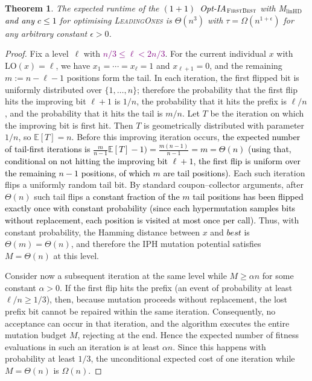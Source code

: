 \documentclass[lettersize,journal]{IEEEtran}
\newcommand{\new}[1]{\textcolor{black}{#1}}
\newcommand{\rerev}[1]{\textcolor{purple}{#1}}
\newcommand{\EE}{\mathbb{E}}
\newcommand{\linHD}{M$_{\text{linHD}}$}
\newtheorem{theorem}{Theorem}
\begin{document}
\begin{theorem}\label{thm:FBleadingones}
The expected runtime of the \new{$(1+1)$~Opt-IA$_{\textsc{FirstBest}}$}  with {\linHD } \new{and any $c\leq 1$} for optimising
\textsc{LeadingOnes} is $\Theta(n^3)$ with $\tau=\Omega(n^{1+\epsilon})$ for any arbitrary
constant $\epsilon>0$.
\end{theorem}
\begin{proof}

Fix a level~$\ell$ with \rerev{$n/3 \le \ell < 2n/3$}. For the current individual $x$ with $\mathrm{LO}(x)=\ell$, we have $x_1=\cdots=x_{\ell}=1$ and $x_{\ell+1}=0$, and the remaining $m:=n-\ell-1$ positions form the tail. In each iteration, the first flipped bit is uniformly distributed over $\{1,\dots,n\}$; therefore the probability that the first flip hits the improving bit $\ell+1$ is $1/n$, the probability that it hits the prefix is $\ell/n$, and the probability that it hits the tail is $m/n$. Let $T$ be the iteration on which the improving bit is first hit. Then $T$ is geometrically distributed with parameter~$1/n$, so $\EE[T]=n$. Before this improving iteration occurs, \textcolor{black}{the expected number of tail-first iterations is
$\frac{m}{n-1}\EE[T]-1) = \frac{m(n-1)}{n-1} = m = \Theta(n)$
(using that, conditional on not hitting the improving bit $\ell+1$, the
first flip is uniform over the remaining $n-1$ positions, of which $m$
are tail positions).} Each such iteration flips a uniformly random tail bit. By standard coupon--collector arguments, after $\Theta(n)$ such tail flips \textcolor{black}{a constant fraction of the $m$ tail positions has been flipped exactly once
with constant probability (since each hypermutation samples bits without
replacement, each position is visited at most once per call).} Thus, with constant probability, the Hamming distance between $x$ and \textcolor{black}{$\mathit{best}$} is $\Theta(m)=\Theta(n)$, and therefore the IPH mutation potential satisfies $M=\Theta(n)$ at this level.

Consider now a subsequent iteration at the same level while $M\ge \alpha n$ for some constant $\alpha>0$. If the first flip hits the prefix (an event of probability at least $\ell/n\ge 1/3$), then, because mutation proceeds without replacement, the lost prefix bit cannot be repaired within the same iteration. Consequently, no acceptance can occur in that iteration, and the algorithm executes the entire mutation budget $M$, rejecting at the end. Hence the expected number of fitness evaluations in such an iteration is at least $\alpha n$. Since this happens with probability at least $1/3$, the unconditional expected cost of one iteration while $M=\Theta(n)$ is $\Omega(n)$.


\end{proof}
\end{document}
